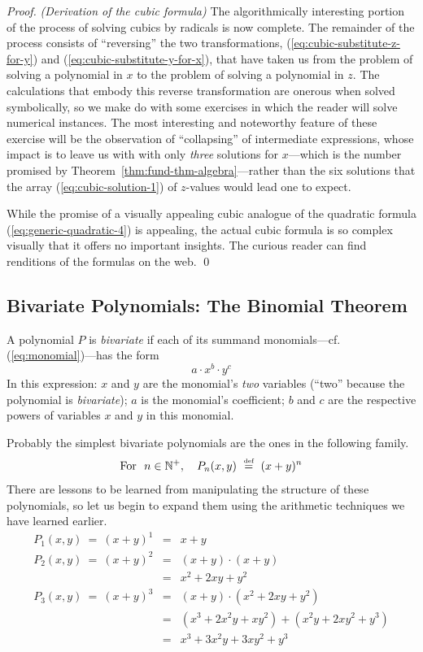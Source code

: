 \begin{proof} {\it (Derivation of the cubic formula)}
The algorithmically interesting portion of the process of solving
cubics by radicals is now complete.  The remainder of the process
consists of ``reversing'' the two transformations,
(\ref{eq:cubic-substitute-z-for-y}) and
(\ref{eq:cubic-substitute-y-for-x}), that have taken us from the
problem of solving a polynomial in $x$ to the problem of solving a
polynomial in $z$.  The calculations that embody this reverse
transformation are onerous when solved symbolically, so we make do
with some exercises in which the reader will solve numerical
instances.  The most interesting and noteworthy feature of these
exercise will be the observation of ``collapsing'' of intermediate
expressions, whose impact is to leave us with with only {\em three}
solutions for $x$---which is the number promised by
Theorem~\ref{thm:fund-thm-algebra}---rather than the six solutions
that the array (\ref{eq:cubic-solution-1}) of $z$-values would lead
one to expect.

While the promise of a visually appealing cubic analogue of the
quadratic formula (\ref{eq:generic-quadratic-4}) is appealing, the
actual cubic formula is so complex visually that it offers no
important insights.  The curious reader can find renditions of the
formulas on the web.  \qed
\end{proof}

\subsection{Bivariate Polynomials: The Binomial Theorem}
\label{sec:bivariate-polynomials}
\label{sec:Binomial-thm}

A polynomial $P$ is {\em bivariate} if each of its summand
monomials---cf. (\ref{eq:monomial})---has the form
\[ a \cdot x^b \cdot y^c \]
In this expression: $x$ and $y$ are the monomial's {\em two} variables
(``two'' because the polynomial is {\em bivariate}); $a$ is the
monomial's coefficient; $b$ and $c$ are the respective powers of
variables $x$ and $y$ in this monomial.

Probably the simplest bivariate polynomials are the ones in the
following family.
\begin{equation}
\label{eq:binomial-polys}
\mbox{For } \ n \in \mathbb{N}^+, \ \ \
P_n(x,y) \ \stackrel{\mbox{{\tiny def}}}{=} \ (x+y)^n
\end{equation}
There are lessons to be learned from manipulating the structure of
these polynomials, so let us begin to expand them using the arithmetic
techniques we have learned earlier.
\begin{eqnarray*}
P_1(x,y) \ = \
(x+y)^1 & = & x+y  \\
P_2(x,y) \ = \
(x+y)^2 & = & (x+y) \cdot (x+y) \\
        & = & x^2 + 2xy + y^2 \\
P_3(x,y) \ = \
(x+y)^3 & = & (x+y) \cdot (x^2 + 2xy + y^2) \\
   & = & (x^3 + 2x^2y +  xy^2) + (x^2y + 2xy^2 + y^3) \\
   & = & x^3 + 3x^2y + 3xy^2 + y^3  
\end{eqnarray*}

